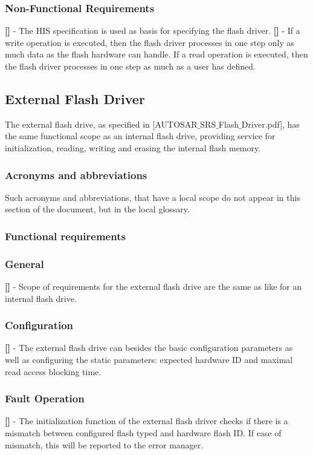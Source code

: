 \subsubsection{Non-Functional Requirements}
{\bf []} - The \mbox{HIS} specification is used as basis for specifying the flash driver.\newline
\newline
{\bf []} - If a write operation is executed, then the flash driver processes in one step only as much data as the flash hardware can handle. If a read operation is executed, then the flash driver processes in one step as much as a user has defined.

\newpage
\subsection{External Flash Driver}
The external flash drive, as specified in  [AUTOSAR$\_$SRS$\_$Flash$\_$Driver.pdf],  has the same functional scope as an internal flash drive, providing service for initialization, reading, writing and erasing the internal flash memory.
\subsubsection{Acronyms and abbreviations}
Such acronyms and abbreviations, that have a local scope do not appear in this section of the document, but in the local glossary.
\subsubsection{Functional requirements}
\subsubsection{General}
{\bf []} - Scope of requirements for the external flash drive are the same as like for an internal flash drive.
\subsubsection{Configuration}
{\bf []} - The external flash drive can besides the basic configuration parameters as well as configuring the static parameters: expected hardware ID and maximal read access blocking time.
\subsubsection{Fault Operation}
{\bf []} - The initialization function of the external flash driver checks if there is a mismatch between configured flash typed and hardware flash ID. If case of mismatch, this will be reported to the error manager.
